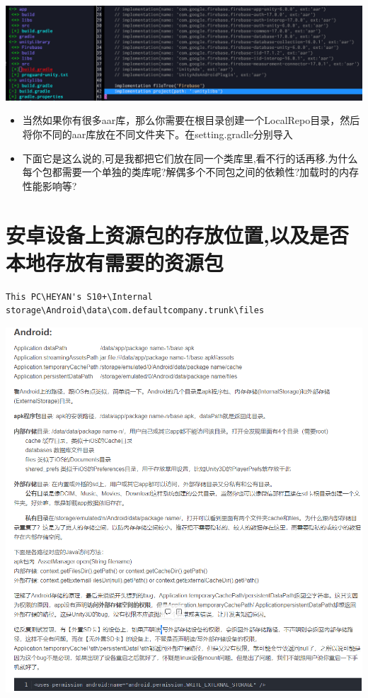 \documentclass[9pt, b5paper]{article}
\begin{document}
\includegraphics[width=.9\linewidth]{./pic/unityToAndroid_20221124_162337.png}
\begin{itemize}
\item 当然如果你有很多aar库，那么你需要在根目录创建一个LocalRepo目录，然后将你不同的aar库放在不同文件夹下。在setting.gradle分别导入
\item 下面它是这么说的,可是我都把它们放在同一个类库里,看不行的话再移.为什么每个包都需要一个单独的类库呢?解偶多个不同包之间的依赖性?加载时的内存性能影响等?
\end{itemize}

\section{安卓设备上资源包的存放位置,以及是否本地存放有需要的资源包}
\label{sec-9}
\begin{verbatim}
This PC\HEYAN's S10+\Internal storage\Android\data\com.defaultcompany.trunk\files
\end{verbatim}

\includegraphics[width=.9\linewidth]{./pic/unityToAndroid_20221124_135846.png}
\end{document}
